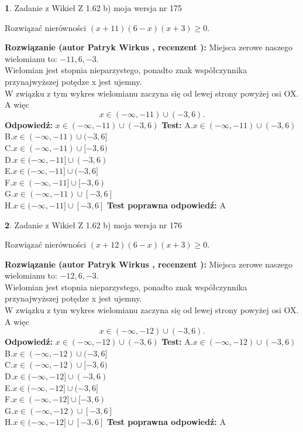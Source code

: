 \documentclass[12pt, a4paper]{article}
\theoremstyle{definition} %
\newtheorem{zad}{}
\newcommand{\zadStart}[1]{\begin{zad}#1\newline}
\newcommand{\zadStop}{\end{zad}}
\newcommand{\rozwStart}[2]{\noindent \textbf{Rozwiązanie (autor #1 , recenzent #2): }\newline}
\newcommand{\rozwStop}{\newline}
\newcommand{\odpStart}{\noindent \textbf{Odpowiedź:}\newline}
\newcommand{\odpStop}{\newline}
\newcommand{\testStart}{\noindent \textbf{Test:}\newline}
\newcommand{\testStop}{\newline}
\newcommand{\kluczStart}{\noindent \textbf{Test poprawna odpowiedź:}\newline}
\newcommand{\kluczStop}{\newline}
\begin{document}
\zadStart{Zadanie z Wikieł Z 1.62 b) moja wersja nr 175}

Rozwiązać nierówności $(x+11)(6-x)(x+3)\ge0$.
\zadStop
\rozwStart{Patryk Wirkus}{}
Miejsca zerowe naszego wielomianu to: $-11, 6, -3$.\\
Wielomian jest stopnia nieparzystego, ponadto znak współczynnika przy\linebreak najwyższej potędze x jest ujemny.\\ W związku z tym wykres wielomianu zaczyna się od lewej strony powyżej osi OX. A więc $$x \in (-\infty,-11) \cup (-3,6).$$
\rozwStop
\odpStart
$x \in (-\infty,-11) \cup (-3,6)$
\odpStop
\testStart
A.$x \in (-\infty,-11) \cup (-3,6)$\\
B.$x \in (-\infty,-11) \cup (-3,6]$\\
C.$x \in (-\infty,-11) \cup [-3,6)$\\
D.$x \in (-\infty,-11] \cup (-3,6)$\\
E.$x \in (-\infty,-11] \cup (-3,6]$\\
F.$x \in (-\infty,-11] \cup [-3,6)$\\
G.$x \in (-\infty,-11) \cup [-3,6]$\\
H.$x \in (-\infty,-11] \cup [-3,6]$
\testStop
\kluczStart
A
\kluczStop



\zadStart{Zadanie z Wikieł Z 1.62 b) moja wersja nr 176}

Rozwiązać nierówności $(x+12)(6-x)(x+3)\ge0$.
\zadStop
\rozwStart{Patryk Wirkus}{}
Miejsca zerowe naszego wielomianu to: $-12, 6, -3$.\\
Wielomian jest stopnia nieparzystego, ponadto znak współczynnika przy\linebreak najwyższej potędze x jest ujemny.\\ W związku z tym wykres wielomianu zaczyna się od lewej strony powyżej osi OX. A więc $$x \in (-\infty,-12) \cup (-3,6).$$
\rozwStop
\odpStart
$x \in (-\infty,-12) \cup (-3,6)$
\odpStop
\testStart
A.$x \in (-\infty,-12) \cup (-3,6)$\\
B.$x \in (-\infty,-12) \cup (-3,6]$\\
C.$x \in (-\infty,-12) \cup [-3,6)$\\
D.$x \in (-\infty,-12] \cup (-3,6)$\\
E.$x \in (-\infty,-12] \cup (-3,6]$\\
F.$x \in (-\infty,-12] \cup [-3,6)$\\
G.$x \in (-\infty,-12) \cup [-3,6]$\\
H.$x \in (-\infty,-12] \cup [-3,6]$
\testStop
\kluczStart
A
\kluczStop
\end{document}
